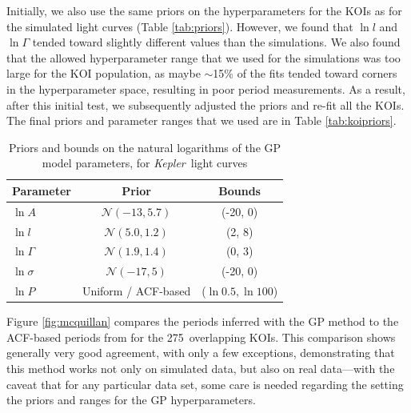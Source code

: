 \documentclass[useAMS, usenatbib, preprint, 12pt]{aastex}
\newcommand{\nkoimcq}{275}
\newcommand{\Kepler}{{\it Kepler}}
\begin{document}
Initially, we also use the same priors on the hyperparameters for the KOIs 
as for the simulated light curves (Table \ref{tab:priors}).  
However, we found that $\ln l$ and $\ln \Gamma$ tended toward slightly different
values than the simulations.  We also found that the allowed hyperparameter
range that we used for the simulations was too large for the KOI population, 
as maybe $\sim$15\% of the fits tended toward corners in the hyperparameter
space, resulting in poor period measurements.  As a result, after this initial
test, we subsequently adjusted the priors and re-fit all the KOIs.  The final 
priors and parameter ranges that we used are in Table \ref{tab:koipriors}.

\begin{table}
\begin{center}
\caption{Priors and bounds on the natural logarithms of the GP model parameters, 
        for \Kepler\ light curves}
\begin{tabular}{lcc}
Parameter & Prior & Bounds\\
    \hline
    $\ln A$ & $\mathcal N(-13, 5.7)$ & (-20, 0) \\
    $\ln l$ & $\mathcal N(5.0, 1.2)$ & (2, 8) \\
    $\ln \Gamma$ & $\mathcal N(1.9, 1.4)$ & (0, 3) \\
    $\ln \sigma$ & $\mathcal N(-17, 5)$ & (-20, 0) \\
    $\ln P $ & Uniform / ACF-based & ($\ln 0.5, \ln 100$) \\ 
\end{tabular}
\end{center}
\end{table}
\label{tab:koipriors}

Figure \ref{fig:mcquillan} compares the periods inferred with the GP method to the
ACF-based periods from \citet{Mcquillan2013} for the \nkoimcq\ overlapping KOIs.
This comparison shows generally very good agreement, with only a few exceptions, 
demonstrating that this method works not only on simulated data, but also on 
real data---with the caveat that for any particular data set, some care is needed 
regarding the setting the priors and ranges for the GP hyperparameters.
\end{document}
